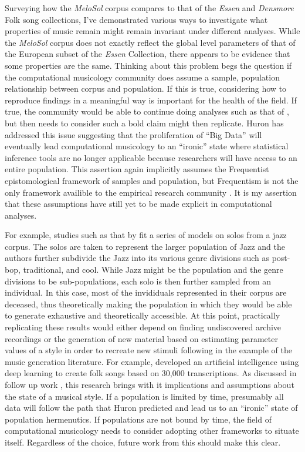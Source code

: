 \documentclass[]{book}
\begin{document}
Surveying how the \emph{MeloSol} corpus compares to that of the \emph{Essen} and \emph{Densmore} Folk song collections, I've demonstrated various ways to investigate what properties of music remain might remain invariant under different analyses.
While the \emph{MeloSol} corpus does not exactly reflect the global level parameters of that of the European subset of the \emph{Essen} Collection, there appears to be evidence that some properties are the same.
Thinking about this problem begs the question if the computational musicology community does assume a sample, population relationship between corpus and population.
If this is true, considering how to reproduce findings in a meaningful way is important for the health of the field.
If true, the community would be able to continue doing analyses such as that of \citet{huronMelodicArchWestern1996}, but then needs to consider such a bold claim might then replicate.
Huron has addressed this issue \citep{huronVirtuousVexatiousAge2013} suggesting that the proliferation of ``Big Data'' will eventually lead computational musicology to an ``ironic'' state where statistical inference tools are no longer applicable because researchers will have access to an entire population.
This assertion again implicitly assumes the Frequentist epistomological framework of samples and population, but Frequentism is not the only framework availible to the empirical research community \citep{dienesUnderstandingPsychologyScience2008}.
It is my assertion that these assumptions have still yet to be made explicit in computational analyses.

For example, studies such as that by \citet{frielerTellingStoryDramaturgy2016} fit a series of models on solos from a jazz corpus.
The solos are taken to represent the larger population of Jazz and the authors further subdivide the Jazz into its various genre divisions such as post-bop, traditional, and cool.
While Jazz might be the population and the genre divisions to be sub-populations, each solo is then further sampled from an individual.
In this case, most of the invididuals represented in their corpus are deceased, thus theoretically making the population in which they would be able to generate exhaustive and theoretically accessible.
At this point, practically replicating these results would either depend on finding undiscovered archive recordings or the generation of new material based on estimating parameter values of a style in order to recreate new stimuli following in the example of the music generation literature.
For example, \citet{sturmTakingModelsBack2017} developed an artificial intelligence using deep learning to create folk songs based on 30,000 transcriptions.
As discussed in follow up work \citep{sturmMachineLearningResearch2019}, this research brings with it implications and assumptions about the state of a musical style.
If a population is limited by time, presumably all data will follow the path that Huron predicted and lead us to an ``ironic'' state of population hermenutics.
If populations are not bound by time, the field of computational musicology needs to consider adopting other frameworks to situate itself.
Regardless of the choice, future work from this should make this clear.
\end{document}
